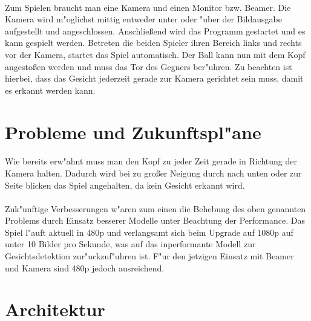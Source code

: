 \documentclass[12pt]{article}
\begin{document}
\paragraph{}
Zum Spielen braucht man eine Kamera und einen Monitor bzw. Beamer. Die Kamera
wird m"oglichst mittig entweder unter oder "uber der Bildausgabe aufgestellt und angeschlossen.
Anschließend wird das Programm gestartet und es kann gespielt werden.
Betreten die beiden Spieler ihren Bereich links und rechts vor der Kamera,
startet das Spiel automatisch. Der Ball kann nun mit dem Kopf angestoßen werden
und muss das Tor des Gegners ber"uhren. Zu beachten ist hierbei, dass
das Gesicht jederzeit gerade zur Kamera gerichtet sein muss, damit es erkannt werden kann.
\section{Probleme und Zukunftspl"ane}
\paragraph{}
Wie bereits erw"ahnt muss man den Kopf zu jeder Zeit gerade in Richtung
der Kamera halten. Dadurch wird bei zu großer Neigung durch nach unten oder zur
Seite blicken das Spiel angehalten, da kein Gesicht erkannt wird.
\paragraph{}
Zuk"unftige Verbesserungen w"aren zum einen die Behebung des oben genannten Problems
durch Einsatz besserer Modelle unter Beachtung der Performance. Das Spiel l"auft aktuell
in 480p und verlangsamt sich beim Upgrade auf 1080p auf unter 10 Bilder pro Sekunde,
was auf das inperformante Modell zur Gesichtsdetektion zur"uckzuf"uhren ist.
F"ur den jetzigen Einsatz mit Beamer und Kamera sind 480p jedoch ausreichend.
\section{Architektur}
\end{document}
